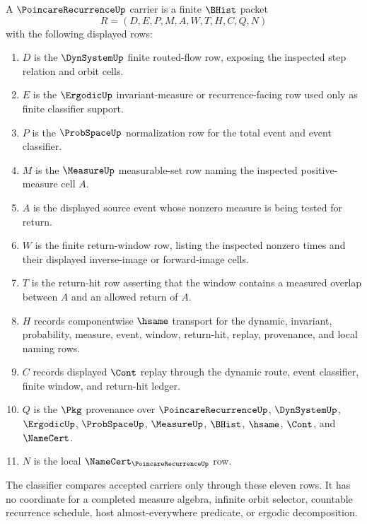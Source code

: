 \begin{definition}
\label{def:poincare-recurrence-carrier}
A $\PoincareRecurrenceUp$ carrier is a finite $\BHist$ packet
$$
R=(D,E,P,M,A,W,T,H,C,Q,N)
$$
with the following displayed rows:
\begin{enumerate}
\item $D$ is the $\DynSystemUp$ finite routed-flow row, exposing the inspected step relation and orbit cells.
\item $E$ is the $\ErgodicUp$ invariant-measure or recurrence-facing row used only as finite classifier support.
\item $P$ is the $\ProbSpaceUp$ normalization row for the total event and event classifier.
\item $M$ is the $\MeasureUp$ measurable-set row naming the inspected positive-measure cell $A$.
\item $A$ is the displayed source event whose nonzero measure is being tested for return.
\item $W$ is the finite return-window row, listing the inspected nonzero times and their displayed inverse-image or forward-image cells.
\item $T$ is the return-hit row asserting that the window contains a measured overlap between $A$ and an allowed return of $A$.
\item $H$ records componentwise $\hsame$ transport for the dynamic, invariant, probability, measure, event, window, return-hit, replay, provenance, and local naming rows.
\item $C$ records displayed $\Cont$ replay through the dynamic route, event classifier, finite window, and return-hit ledger.
\item $Q$ is the $\Pkg$ provenance over $\PoincareRecurrenceUp$, $\DynSystemUp$, $\ErgodicUp$, $\ProbSpaceUp$, $\MeasureUp$, $\BHist$, $\hsame$, $\Cont$, and $\NameCert$.
\item $N$ is the local $\NameCert_{\PoincareRecurrenceUp}$ row.
\end{enumerate}
The classifier compares accepted carriers only through these eleven rows. It has no coordinate for a completed measure algebra, infinite orbit selector, countable recurrence schedule, host almost-everywhere predicate, or ergodic decomposition.
\end{definition}

